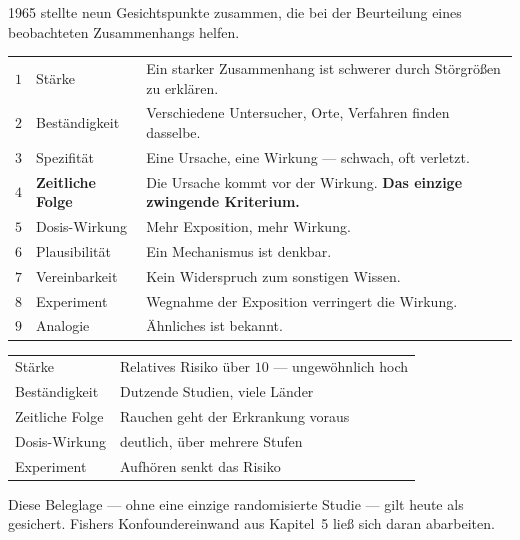 \begin{merksatz}
1965 stellte  neun Gesichtspunkte zusammen, die bei der Beurteilung eines beobachteten Zusammenhangs helfen.

\begin{center}
{\small
\renewcommand{\arraystretch}{1.45}
\begin{tabular}{@{}P{0.7cm}P{2.6cm}P{4.8cm}@{}}
\toprule
$1$ & Stärke & Ein starker Zusammenhang ist schwerer durch Störgrößen zu erklären.\\
$2$ & Beständigkeit & Verschiedene Untersucher, Orte, Verfahren finden dasselbe.\\
$3$ & Spezifität & Eine Ursache, eine Wirkung --- schwach, oft verletzt.\\
$4$ & \textbf{Zeitliche Folge} & Die Ursache kommt vor der Wirkung. \textcolor{akzent}{\textbf{Das einzige zwingende Kriterium.}}\\
$5$ & Dosis-Wirkung & Mehr Exposition, mehr Wirkung.\\
$6$ & Plausibilität & Ein Mechanismus ist denkbar.\\
$7$ & Vereinbarkeit & Kein Widerspruch zum sonstigen Wissen.\\
$8$ & Experiment & Wegnahme der Exposition verringert die Wirkung.\\
$9$ & Analogie & Ähnliches ist bekannt.\\
\bottomrule
\end{tabular}}
\end{center}

\begin{center}
\begin{minipage}{0.88\textwidth}
\end{minipage}
\end{center}

\begin{center}
\renewcommand{\arraystretch}{1.45}
\begin{tabular}{@{}P{2.6cm}P{5.8cm}@{}}
\toprule
Stärke & Relatives Risiko über $10$ --- ungewöhnlich hoch\\
Beständigkeit & Dutzende Studien, viele Länder\\
Zeitliche Folge & Rauchen geht der Erkrankung voraus\\
Dosis-Wirkung & \textcolor{gruen}{deutlich, über mehrere Stufen}\\
Experiment & Aufhören senkt das Risiko\\
\bottomrule
\end{tabular}
\end{center}

Diese Beleglage --- ohne eine einzige randomisierte Studie --- gilt heute als gesichert. Fishers Konfoundereinwand aus Kapitel~5 ließ sich daran abarbeiten.
\end{merksatz}

